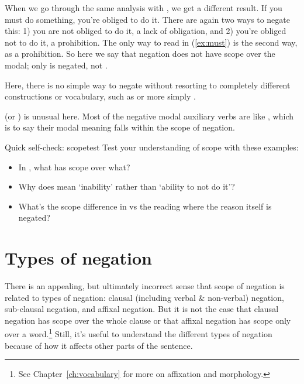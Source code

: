 When we go through the same analysis with , we get a different result. If you must do something, you're obliged to do it. There are again two ways to negate this: 1) you are not obliged to do it, a lack of obligation, and 2) you're obliged not to do it, a prohibition. The only way to read  in (\ref{ex:must}) is the second way, as a prohibition. So here we say that negation does not have scope over the modal; only  is negated, not .

Here, there is no simple way to negate  without resorting to completely different constructions or vocabulary, such as  or more simply .

 (or ) is unusual here. Most of the negative modal auxiliary verbs are like , which is to say their modal meaning falls within the scope of negation.

\begin{tblsframedsymbol}{Quick self-check: scope}{test}
Test your understanding of scope with these examples:
\begin{itemize}[noitemsep, leftmargin=*]
    \item In , what has scope over what?
    \item Why does  mean `inability' rather than `ability to not do it'?
    \item What's the scope difference in  vs the reading where the reason itself is negated?
\end{itemize}
\end{tblsframedsymbol}

\section{Types of negation} \label{sec:types-of-negation}

There is an appealing, but ultimately incorrect sense that scope of negation is related to types of negation: clausal (including verbal \& non-verbal) negation, sub-clausal negation, and affixal negation. But it is not the case that clausal negation has scope over the whole clause or that affixal negation has scope only over a word.\footnote{See Chapter~\ref{ch:vocabulary} for more on affixation and morphology.} Still, it's useful to understand the different types of negation because of how it affects other parts of the sentence.


